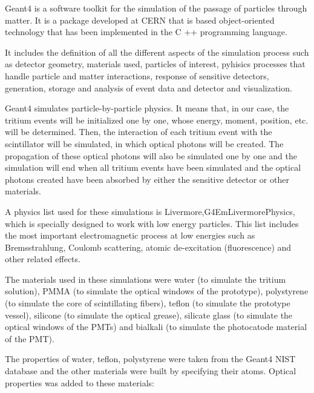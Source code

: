 Geant4 is a software toolkit for the simulation of the passage of particles through matter. It is a package developed at CERN that is based object-oriented technology that has been implemented in the C ++ programming language.

It includes the definition of all the different aspects of the simulation process such as detector geometry, materials used, particles of interest, pyhisics processes that handle particle and matter interactions, response of sensitive detectors, generation, storage and analysis of event data and detector and visualization.

Geant4 simulates particle-by-particle physics. It means that, in our case, the tritium events will be initialized one by one, whose energy, moment, position, etc. will be determined. Then, the interaction of each tritium event with the scintillator will be simulated, in which optical photons will be created. The propagation of these optical photons will also be simulated one by one and the simulation will end when all tritium events have been simulated and the optical photons created have been absorbed by either the sensitive detector or other materials.

A physics list used for these simulations is Livermore,\newline G4EmLivermorePhysics, which is specially designed to work with low energy particles. This list includes the most important electromagnetic process at low energies such as Bremsstrahlung, Coulomb scattering, atomic de-excitation (fluorescence) and other related effects.

The materials used in these simulations were water (to simulate the tritium solution), PMMA (to simulate the optical windows of the prototype), polystyrene (to simulate the core of scintillating fibers), teflon (to simulate the prototype vessel), silicone (to simulate the optical grease), silicate glass (to simulate the optical windows of the PMTs) and bialkali (to simulate the photocatode material of the PMT).

The properties of water, teflon, polystyrene were taken from the Geant4 NIST database and the other materials were built by specifying their atoms. Optical properties was added to these materials:

